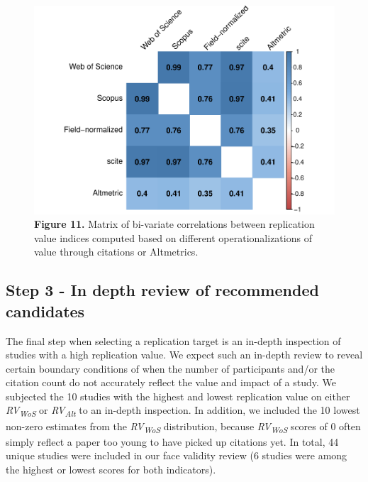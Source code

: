 \documentclass[
  man,floatsintext]{apa6}
\begin{document}
\begin{figure}
\centering
\includegraphics{RVcn_feasibility_in_social_neuroscience_cortex_files/figure-latex/fig11-1.pdf}
\caption{\label{fig:fig11}\textbf{Figure 11.} Matrix of bi-variate correlations between replication value indices computed based on different operationalizations of value through citations or Altmetrics.}
\end{figure}

\hypertarget{step-3---in-depth-review-of-recommended-candidates}{%
\subsection{Step 3 - In depth review of recommended candidates}\label{step-3---in-depth-review-of-recommended-candidates}}

The final step when selecting a replication target is an in-depth inspection of studies with a high replication value. We expect such an in-depth review to reveal certain boundary conditions of when the number of participants and/or the citation count do not accurately reflect the value and impact of a study. We subjected the 10 studies with the highest and lowest replication value on either \emph{RV\textsubscript{WoS}} or \emph{RV\textsubscript{Alt}} to an in-depth inspection. In addition, we included the 10 lowest non-zero estimates from the \emph{RV\textsubscript{WoS}} distribution, because \emph{RV\textsubscript{WoS}} scores of 0 often simply reflect a paper too young to have picked up citations yet. In total, 44 unique studies were included in our face validity review (6 studies were among the highest or lowest scores for both indicators).
\end{document}
